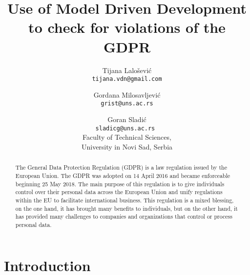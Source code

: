 \documentclass[11pt,english]{article}
\begin{document}
\title{Use of Model Driven Development to check for violations of the GDPR}
\author{
  Tijana Lalošević\\
  \texttt{tijana.vdn@gmail.com}
  \and
  Gordana Milosavljević\\
  \texttt{grist@uns.ac.rs}
  \and
  Goran Sladić\\
  \texttt{sladicg@uns.ac.rs }
  \\Faculty of Technical Sciences,\\ University in Novi Sad, Serbia
}


\date{}
\maketitle


\begin{abstract}
The General Data Protection Regulation (GDPR) is a law regulation issued by the European Union. The GDPR was adopted on 14 April 2016 and became enforceable beginning 25 May 2018. The main purpose of this regulation is to give individuals control over their personal data across the European Union and unify regulations within the EU to facilitate international business. This regulation is a mixed blessing, on the one hand, it has brought many benefits to individuals, but on the other hand, it has provided many challenges to companies and organizations that control or process personal data.
\end{abstract}


\section{Introduction}
\end{document}
